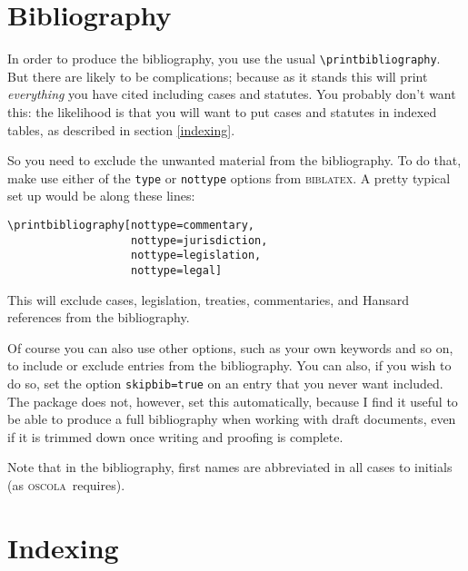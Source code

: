 \documentclass[a5paper,fontsize=9pt,DIV=1]{scrartcl}
\newcommand{\biblatex}{\textsc{biblatex}}
\newcommand{\oscolashort}{\textsc{oscola}\nocite{oscola}}
\newcounter{egcounter}\setcounter{egcounter}{0}
\newenvironment{bibexample}[1][]{%
  \medskip\par\small\noindent\ignorespaces
  \marginpar{[\refstepcounter{egcounter}\arabic{egcounter}]\label{#1}}
  \begin{minipage}[t]{0.95\linewidth}}
 {\end{minipage}\par\medskip}
\begin{document}
\section{Bibliography}

In order to produce the bibliography, you use the usual
\verb|\printbibliography|.
But there are likely to be complications;
because as it stands this will print \emph{everything} you have cited
including cases and statutes. You probably don't want this: the
likelihood is that you will want to put cases and statutes in indexed
tables, as described in section \ref{indexing}.

So you need to exclude the unwanted material from the bibliography. To do that, make use either of the \texttt{type} or \texttt{nottype} options from \biblatex. A pretty typical set up would be along these lines:
\begin{bibexample}[bibliography]
\begin{verbatim}
\printbibliography[nottype=commentary,
                   nottype=jurisdiction,
                   nottype=legislation,
                   nottype=legal]
\end{verbatim}
\end{bibexample}
This will exclude cases, legislation, treaties, commentaries, and
Hansard references from the bibliography.

Of course you can also use other options, such as your own keywords
and so on, to include or exclude entries from the bibliography. You
can also, if you wish to do so, set the option \verb|skipbib=true| on
an entry that you never want included. The package does not, however,
set this automatically, because I find it useful to be able to produce
a full bibliography when working with draft documents, even if it is
trimmed down once writing and proofing is complete.

Note that in the bibliography, first names are abbreviated in all cases to initials (as \oscolashort\ requires).

\section{Indexing\label{indexing}}
\end{document}
